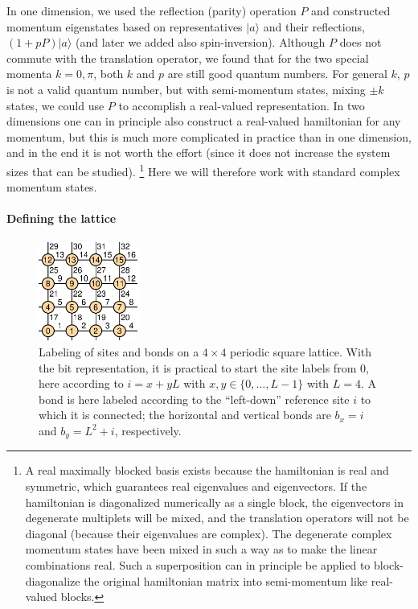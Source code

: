 \documentclass[draft,numberedheadings]{aipproc}
\begin{document}
In one dimension, we used the reflection (parity) operation $P$ and constructed momentum eigenstates based on representatives $|a\rangle$ and their reflections, 
$(1 + pP)|a\rangle$ (and later we added also spin-inversion). Although $P$ does not commute with the translation operator, we found that for the two
special momenta $k=0,\pi$, both $k$ and $p$ are still good quantum numbers. For general $k$, $p$ is not a valid quantum number, but with semi-momentum 
states, mixing $\pm k$ states, we could use $P$ to accomplish a real-valued representation. In two dimensions one can in principle also 
construct a real-valued hamiltonian for any  momentum, but this is much more complicated in practice than in one dimension, and in the end it is not 
worth the effort (since it does not increase the system sizes that can be studied).
\footnote{A real maximally blocked basis exists because the hamiltonian is real 
and symmetric, which guarantees real eigenvalues and eigenvectors. If the hamiltonian is diagonalized numerically as a single block, the eigenvectors 
in degenerate multiplets will be mixed, and the translation operators will not be diagonal (because their eigenvalues are 
complex). The degenerate complex momentum states have been mixed in such a way as to make the linear combinations real. Such a superposition can in 
principle be applied to block-diagonalize the original hamiltonian matrix into semi-momentum like real-valued blocks.}  
 Here we will therefore work with standard complex momentum states.

\paragraph{Defining the lattice}

\begin{figure}
\includegraphics[width=3.25cm, clip]{spinbondlabels.eps}
\caption{Labeling of sites and bonds on a $4\times 4$ periodic square lattice. With the bit representation, it is practical to start the site 
labels from $0$, here according to $i=x+yL$ with $x,y \in \{0,\ldots,L-1\}$ with $L=4$. A bond is here labeled according to the ``left-down''
reference site $i$ to which it is connected; the horizontal and vertical bonds are $b_x=i$ and $b_y=L^2+i$, respectively.}
\label{sblabels2d}
\end{figure}
\end{document}
